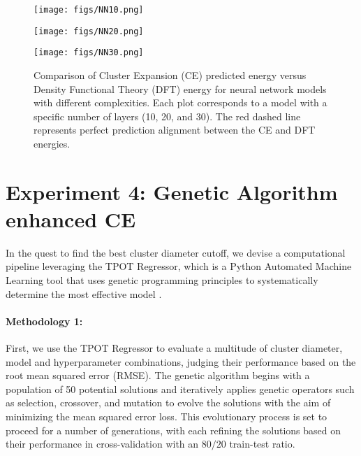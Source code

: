 \documentclass{article}
\begin{document}
\begin{figure}[h!]
    \centering
    \begin{minipage}{0.32\textwidth}
        \centering
        \texttt{[image: figs/NN10.png]}
        \label{fig:Experiment3-nn10}
    \end{minipage}\hfill
    \begin{minipage}{0.32\textwidth}
        \centering
         \texttt{[image: figs/NN20.png]}
        \label{fig:Experiment3-nn20}
    \end{minipage}
    \hfill
    \begin{minipage}{0.32\textwidth}
        \centering
         \texttt{[image: figs/NN30.png]}
       \label{fig:Experiment3-nn30}
    \end{minipage}
\label{fig:Experiment13D_5CV}
\caption{Comparison of Cluster Expansion (CE) predicted energy versus Density Functional Theory (DFT) energy for neural network models with different complexities. Each plot corresponds to a model with a specific number of layers (10, 20, and 30). The red dashed line represents perfect prediction alignment between the CE and DFT energies.}
\end{figure}

\section{Experiment 4: Genetic Algorithm enhanced CE}
In the quest to find the best cluster diameter cutoff, we devise a computational pipeline leveraging the TPOT Regressor, which is a Python Automated Machine Learning tool that uses genetic programming principles to systematically determine the most effective model \cite{TPOT}. 
\paragraph{Methodology 1:}First, we use the TPOT Regressor to evaluate a multitude of cluster diameter, model and hyperparameter combinations, judging their performance based on the root mean squared error (RMSE). The genetic algorithm begins with a population of 50 potential solutions and iteratively applies genetic operators such as selection, crossover, and mutation to evolve the solutions with the aim of minimizing the mean squared error loss. This evolutionary process is set to proceed for a number of generations, with each refining the solutions based on their performance in cross-validation with an $80/20$ train-test ratio. 
\end{document}

